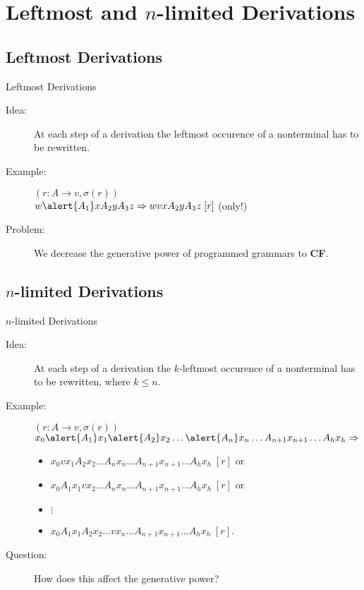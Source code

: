 \documentclass{beamer}
\begin{document}
\section{Leftmost and $n$-limited Derivations}

\subsection{Leftmost Derivations}

\begin{frame}{Leftmost Derivations}
	\begin{description}
		\item[Idea:] At each step of a derivation the leftmost occurence of a nonterminal has to be rewritten. \\
		\bigskip
		\item[Example:] $(r: A \rightarrow v, \sigma(r))$ \\
			$w\alert{A_{1}}xA_{2}yA_{3}z \Rightarrow wvxA_{2}yA_{3}z\;[r]$ \quad(only!) \\
		\bigskip
		\item[Problem:] We decrease the generative power of programmed grammars to \textbf{CF}.
	\end{description}
\end{frame}

\subsection{$n$-limited Derivations}

\begin{frame}{$n$-limited Derivations}
	\begin{description}
		\item[Idea:] At each step of a derivation the \alert{$k$-leftmost} occurence of a nonterminal has to be rewritten,
			where \alert{$k \leq n$}. \\
		\medskip
		\item[Example:] $(r: A \rightarrow v, \sigma(r))$ \\
			$x_{0}\alert{A_{1}}x_{1}\alert{A_{2}}x_{2}\dots \alert{A_{n}}x_{n}\dots A_{n+1}x_{n+1}\dots A_{h}x_{h} \Rightarrow$
			\begin{itemize}
				\item[] $x_{0}vx_{1}A_{2}x_{2}\dots A_{n}x_{n}\dots A_{n+1}x_{n+1}\dots A_{h}x_{h}\;[r]$ or
				\item[] $x_{0}A_{1}x_{1}vx_{2}\dots A_{n}x_{n}\dots A_{n+1}x_{n+1}\dots A_{h}x_{h}\;[r]$ or
				\item[] \hspace{3cm} $\vdots$
				\item[] $x_{0}A_{1}x_{1}A_{2}x_{2}\dots vx_{n}\dots A_{n+1}x_{n+1}\dots A_{h}x_{h}\;[r]$.
			\end{itemize}
		\medskip
		\item[Question:] How does this affect the generative power?
	\end{description}
\end{frame}
\end{document}
